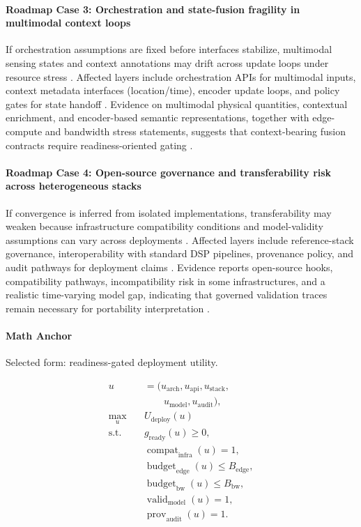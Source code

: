 \documentclass[lettersize,journal]{IEEEtran}
\begin{document}
\paragraph{Roadmap Case 3: Orchestration and state-fusion fragility in multimodal context loops}
If orchestration assumptions are fixed before interfaces stabilize, multimodal sensing states and context annotations may drift across update loops under resource stress \cite{O_ISAC_151}. Affected layers include orchestration APIs for multimodal inputs, context metadata interfaces (location/time), encoder update loops, and policy gates for state handoff \cite{O_ISAC_151}. Evidence on multimodal physical quantities, contextual enrichment, and encoder-based semantic representations, together with edge-compute and bandwidth stress statements, suggests that context-bearing fusion contracts require readiness-oriented gating \cite{O_ISAC_151}.

\paragraph{Roadmap Case 4: Open-source governance and transferability risk across heterogeneous stacks}
If convergence is inferred from isolated implementations, transferability may weaken because infrastructure compatibility conditions and model-validity assumptions can vary across deployments \cite{O_ISAC_200}. Affected layers include reference-stack governance, interoperability with standard DSP pipelines, provenance policy, and audit pathways for deployment claims \cite{O_ISAC_200}. Evidence reports open-source hooks, compatibility pathways, incompatibility risk in some infrastructures, and a realistic time-varying model gap, indicating that governed validation traces remain necessary for portability interpretation \cite{O_ISAC_200}.

\paragraph{Math Anchor}
Selected form: readiness-gated deployment utility.

\begin{equation}
\begin{aligned}
u &= (u_{\mathrm{arch}},u_{\mathrm{api}},u_{\mathrm{stack}},\\
&\qquad u_{\mathrm{model}},u_{\mathrm{audit}}),\\
\max_{u} \quad & U_{\mathrm{deploy}}(u) \\
\text{s.t.} \quad & g_{\mathrm{ready}}(u) \ge 0, \\
& \operatorname{compat}_{\mathrm{infra}}(u)=1, \\
& \operatorname{budget}_{\mathrm{edge}}(u) \le B_{\mathrm{edge}}, \\
& \operatorname{budget}_{\mathrm{bw}}(u) \le B_{\mathrm{bw}}, \\
& \operatorname{valid}_{\mathrm{model}}(u)=1, \\
& \operatorname{prov}_{\mathrm{audit}}(u)=1.
\end{aligned}
\end{equation}
\end{document}
